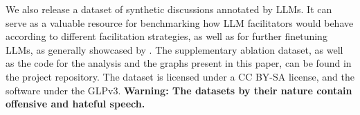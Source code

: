 %

We also release \vmd\datasetlink a dataset of synthetic discussions annotated by \acp{LLM}. It can serve as a valuable resource for benchmarking how \ac{LLM} facilitators would behave according to different facilitation strategies, as well as for further finetuning \acp{LLM}, as generally showcased by \citet{ulmer2024}. The supplementary ablation dataset, as well as the code for the analysis and the graphs present in this paper, can be found in the project repository\analysislink. The dataset is licensed under a CC BY-SA license, and the software under the \ac{GLP}v3. \textbf{Warning: The datasets by their nature contain offensive and hateful speech.}